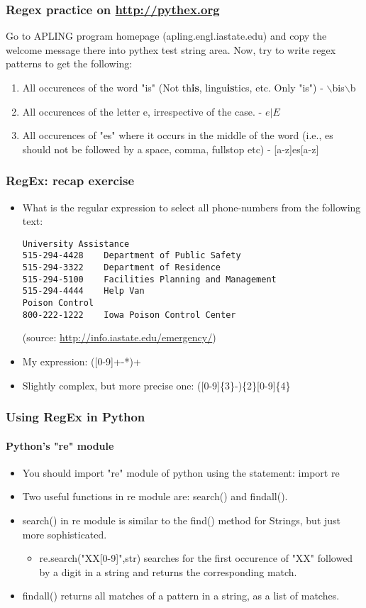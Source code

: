\documentclass{beamer}
\begin{document}
\begin{frame}
\frametitle{Regex practice on \url{http://pythex.org}}
Go to APLING program homepage (apling.engl.iastate.edu) and copy the welcome message there into pythex test string area. Now, try to write regex patterns to get the following:

\begin{enumerate}
\item All occurences of the word "is" (Not th\textbf{is}, lingu\textbf{is}tics, etc. Only "is") - $\backslash$bis$\backslash$b
\item All occurences of the letter e, irrespective of the case. - $e|E$
\item All occurences of "es" where it occurs in the middle of the word (i.e., es should not be followed by a space, comma, fullstop etc) - [a-z]es[a-z]
\end{enumerate}
\end{frame}

\begin{frame}[fragile]
\frametitle{RegEx: recap exercise}
\begin{itemize}
\item What is the regular expression to select all phone-numbers from the following text:
\begin{verbatim}
University Assistance
515-294-4428	Department of Public Safety
515-294-3322	Department of Residence
515-294-5100	Facilities Planning and Management
515-294-4444	Help Van
Poison Control
800-222-1222	Iowa Poison Control Center
\end{verbatim} 
(source: \url{http://info.iastate.edu/emergency/}) \pause
\item My expression: ([0-9]+-*)+ \pause
\item Slightly complex, but more precise one: ([0-9]\{3\}-)\{2\}[0-9]\{4\}
\end{itemize}
\end{frame}

\begin{frame}
\frametitle{Using RegEx in Python}
\framesubtitle{Python's "re" module}
\begin{itemize}
\item You should import "re" module of python using the statement: import re
\item Two useful functions in re module are: search() and findall().
\item search() in re module is similar to the find() method for Strings, but just more sophisticated.
\begin{itemize}
\item re.search("XX[0-9]",str) searches for the first occurence of "XX" followed by a digit in a string and returns the corresponding match.
\end{itemize}
\item findall() returns all matches of a pattern in a string, as a list of matches.
\end{itemize}
\end{frame}
\end{document}
